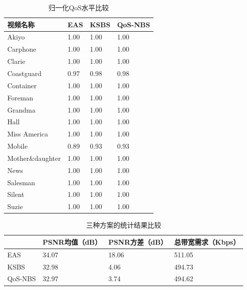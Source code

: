 \begin{table}[htbp]
    \wuhao
    \centering
    \caption{归一化QoS水平比较}
    \begin{tabular*}{\textwidth}{ p{} p{} p{} p{} }
        \toprule
     视频名称&   EAS& KSBS & QoS-NBS \\
     \midrule
Akiyo           	 & 1.00 & 1.00  &1.00\\ 
Carphone        	 & 1.00 & 1.00  &1.00\\ 
Clarie          	 & 1.00 & 1.00  &1.00\\ 
Coastguard      	 & 0.97 & 0.98  &0.98\\ 
Container       	 & 1.00 & 1.00  &1.00\\ 
Foreman         	 & 1.00 & 1.00  &1.00\\ 
Grandma         	 & 1.00 & 1.00  &1.00\\ 
Hall            	 & 1.00 & 1.00  &1.00\\ 
Miss America    	 & 1.00 & 1.00  &1.00\\ 
Mobile          	 & 0.89 & 0.93  &0.93\\ 
Mother\&daughter	 & 1.00 & 1.00  &1.00\\ 
News            	 & 1.00 & 1.00  &1.00\\ 
Salesman        	 & 1.00 & 1.00  &1.00\\ 
Silent          	 & 1.00 & 1.00  &1.00\\ 
Suzie           	 & 1.00 & 1.00  &1.00\\ 
\bottomrule
    \end{tabular*}
    \label{tab:chap_nash:qos_3_schemes}
\end{table}


\begin{table}[htbp]
    \wuhao
    \centering
    \caption{三种方案的统计结果比较}
    \begin{tabular*}{\textwidth}{ p{}p{}p{}p{}}
        \toprule
        & PSNR均值（dB） &PSNR方差（dB） &总带宽需求（Kbps） \\
        \midrule
        EAS & 34.07 & 18.06 & 511.05 \\
        KSBS &32.98 & 4.06 & 494.73 \\
        QoS-NBS & 32.97 & 3.74 & 494.62 \\
        \bottomrule
    \end{tabular*}
    \label{tab:chap_nash:statis_three_schemes}
\end{table}

